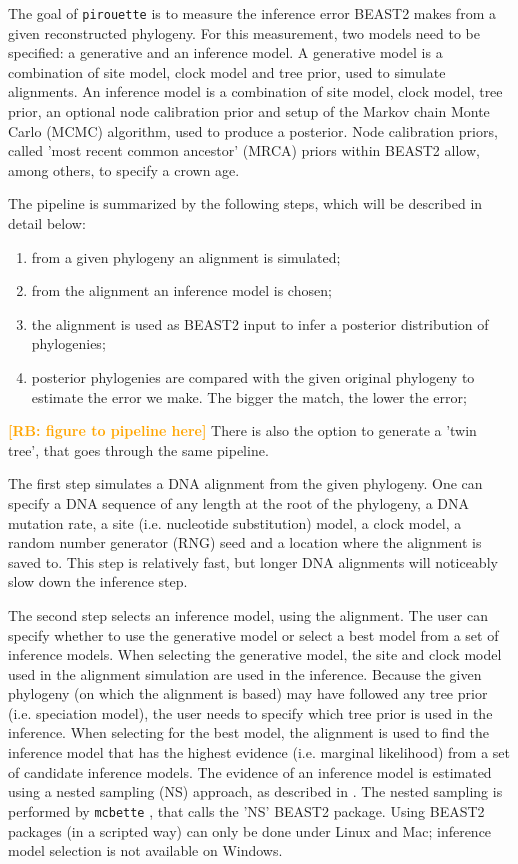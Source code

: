 \documentclass{article}
\newcommand{\richel}[1]{\textcolor{orange}{\textbf{[RB: #1]}}}
\begin{document}
The goal of \verb;pirouette; is to measure the inference error BEAST2
makes from a given reconstructed phylogeny. For this measurement,
two models need to be specified: a generative and an inference model.
A generative model is a combination of site model, clock model and tree prior,
used to simulate alignments. An inference model is a combination of 
site model, clock model, tree prior, an optional node calibration prior
and setup of the Markov chain Monte Carlo (MCMC) algorithm, 
used to produce a posterior. Node calibration priors, called 'most
recent common ancestor' (MRCA) priors within BEAST2 allow, among others,
to specify a crown age.

The pipeline is summarized by the following steps, which will be described in detail below:
\begin{enumerate}
    \item from a given phylogeny an alignment is simulated;
    \item from the alignment an inference model is chosen;
    \item the alignment is used as BEAST2 input to infer a posterior distribution of phylogenies;
    \item posterior phylogenies are compared with the given original phylogeny to estimate the error we make. The bigger the match, the lower the error;
\end{enumerate}
\richel{figure to pipeline here}
There is also the option to generate a 'twin tree',
that goes through the same pipeline.

The first step simulates a DNA alignment from the given phylogeny.
One can specify a DNA sequence
of any length at the root of the phylogeny, a DNA mutation rate, a
site (i.e. nucleotide substitution) model, 
a clock model, a random number generator (RNG) seed and a location
where the alignment is saved to. This step is relatively fast, but longer
DNA alignments will noticeably slow down the inference step.

The second step selects an inference model, using the alignment.
The user can specify whether to use the generative model or select a best model
from a set of inference models. 
When selecting the generative model,
the site and clock model used in the alignment simulation are used
in the inference. Because the given phylogeny (on which the alignment is based)
may have followed any tree prior (i.e. speciation model), the user needs
to specify which tree prior is used in the inference. 
When selecting for the best
model, the alignment is used to find the inference model that has the
highest evidence (i.e. marginal likelihood) from a set of candidate inference models.
The evidence of an inference model is estimated using a nested sampling (NS)
approach, as described in \cite{maturana2018model}. The nested sampling is
performed by \verb;mcbette; \cite{mcbette}, that calls the 'NS' BEAST2 package. 
Using BEAST2 packages (in a scripted way) can only be done under Linux and Mac; 
inference model selection is not available on Windows.
\end{document}

